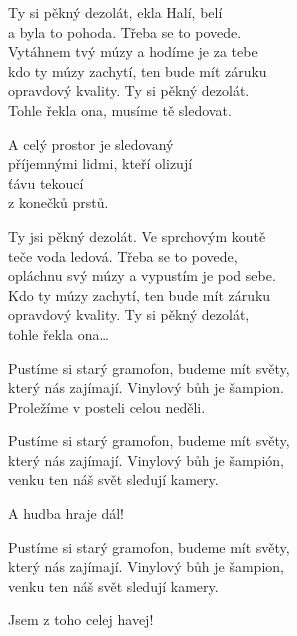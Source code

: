 \ve{}
Ty si pěkný dezolát, ekla Halí, belí\\
a byla to pohoda. Třeba se to povede.\\
Vytáhnem tvý múzy a hodíme je za tebe\\
kdo ty múzy zachytí, ten bude mít záruku\\
opravdový kvality. Ty si pěkný dezolát.\\
Tohle řekla ona, musíme tě sledovat.

\cho{}
A celý prostor je sledovaný\\
příjemnými lidmi, kteří olizují\\
ťávu tekoucí\\
z konečků prstů.
   
\ve{}
Ty jsi pěkný dezolát. Ve sprchovým koutě\\
teče voda ledová. Třeba se to povede,\\
opláchnu svý múzy a vypustím je pod sebe.\\
Kdo ty múzy zachytí, ten bude mít záruku\\
opravdový kvality. Ty si pěkný dezolát,\\
tohle řekla ona\ldots{}
  
\cho{}

\re{*:}
Pustíme si starý gramofon, budeme mít světy,\\
který nás zajímají. Vinylový bůh je šampion.\\
Proležíme v posteli celou neděli.

Pustíme si starý gramofon, budeme mít světy,\\
který nás zajímají. Vinylový bůh je šampión,\\
venku ten náš svět sledují kamery.
   
A hudba hraje dál!
   
Pustíme si starý gramofon, budeme mít světy,\\
který nás zajímají. Vinylový bůh je šampion,\\
venku ten náš svět sledují kamery.
   
Jsem z toho celej havej!

\esong{}